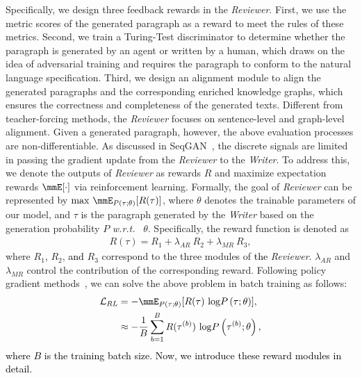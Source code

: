 \documentclass[letterpaper]{article}
\def\xgh{\textcolor{black}}
\def\hmg{\textcolor{black}}
\def\wrt{\emph{w.r.t. }}
\begin{document}
Specifically, we design three feedback rewards in the \textit{Reviewer}. 
{First, we use the metric scores of the generated paragraph as a reward to meet the rules of these metrics. }
Second, we train a Turing-Test discriminator to determine whether the paragraph is generated by an agent or written by a human, which draws on the idea of adversarial training and requires the paragraph to conform to the natural language specification. 
Third, we design an alignment module to align the generated paragraphs and the corresponding enriched knowledge graphs, which ensures the correctness and completeness of the generated texts.
Different from teacher-forcing methods, the \textit{Reviewer} focuses on sentence-level and graph-level alignment.
Given a generated paragraph, however, the above evaluation processes are non-differentiable. As discussed in SeqGAN~\cite{Yu2017SeqGANSG}, the discrete signals 
are limited in passing the gradient update from the \textit{Reviewer} to the \textit{Writer}. To address this, we denote the outputs of \textit{Reviewer} as rewards $R$ and maximize expectation rewards $\mmE [\cdot]$ via reinforcement learning. Formally, the goal of \textit{Reviewer} can be represented by
    $\mathrm{max} \ \mmE_{P(\tau;\theta)} [R(\tau)]$,
where $\theta$ denotes the trainable parameters of our model, and $\tau$ is the paragraph generated by the \textit{Writer} based on the generation probability $P$ \wrt~$\theta$. Specifically, the reward function is denoted as
\begin{equation}
    \begin{aligned}
    R(\tau)=R_1 + \lambda_{AR} \ R_2 + \lambda_{MR} \ R_3,
    \label{eq:reward}
    \end{aligned}
\end{equation}
where $R_{1}$, $R_{2}$, \hmg{and} $R_{3}$  correspond to the three modules of \hmg{the} \textit{Reviewer}. $\lambda_{AR}$ and $\lambda_{MR}$ control the contribution of the corresponding reward. Following policy gradient methods~\cite{Williams92simplestatistical,Schulman2017ProximalPO}, we can solve the above problem in batch training as follows:
\begin{equation}
    \begin{aligned}
    \label{eq:pg}
    \mathcal{L}_{RL} & = - \mmE_{P(\tau;\theta)} [R(\tau) \ \mathrm{log}P\left(\tau;\theta\right)], \\
    & \approx - \frac{1}{B} \sum_{b=1}^{B} R(\tau^{(b)}) \ \mathrm{log}P\left(\tau^{(b)};\theta\right),
    \end{aligned}
\end{equation}
\xgh{where $B$ is the training batch size. Now, we introduce these reward modules in detail.}
\end{document}
